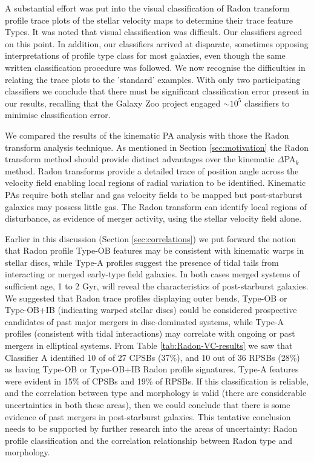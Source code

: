 A substantial effort was put into the visual classification of  Radon transform profile trace plots of the stellar velocity maps to determine their trace feature Types.  It was noted that visual classification was difficult. Our classifiers agreed on this point. In addition, our classifiers arrived at disparate, sometimes opposing interpretations of profile type class for most galaxies, even though the same written classification procedure was followed. We now recognise the difficulties in relating the trace plots to the 'standard' examples. With only two participating classifiers we conclude that there must be significant classification error present in our results, recalling that the Galaxy Zoo project engaged $\sim10^5$ classifiers to minimise classification error.

We compared the results of the kinematic PA analysis with those the Radon transform analysis technique. As mentioned in Section \ref{sec:motivation} the Radon transform method should provide distinct advantages over the kinematic $\Delta$PA$_{k}$ method. Radon transforms provide a detailed trace of position angle across the velocity field enabling local regions of radial variation to be identified. Kinematic PAs require both stellar and gas velocity fields to be mapped but post-starburst galaxies may possess little gas. The Radon transform can identify local regions of disturbance, as evidence of merger activity, using the stellar velocity field alone.

Earlier in this discussion (Section \ref{sec:correlations}) we put forward the notion that Radon profile Type-OB features may be consistent with kinematic warps in stellar discs, while Type-A profiles suggest the presence of tidal tails from interacting or merged early-type field galaxies. In both cases merged systems of sufficient age, 1 to 2 Gyr, will reveal the characteristics of post-starburst galaxies. We suggested that Radon trace profiles displaying outer bends, Type-OB or Type-OB+IB (indicating warped stellar discs) could be considered prospective candidates of past major mergers in disc-dominated systems, while Type-A profiles (consistent with tidal interactions) may correlate with ongoing or past mergers in elliptical systems. From Table \ref{tab:Radon-VC-results} we saw that Classifier A identified 10 of of 27 CPSBs (37\%), and 10 out of 36 RPSBs (28\%) as having Type-OB or Type-OB+IB Radon profile signatures. Type-A features were evident in  15\% of CPSBs and 19\% of RPSBs. If this classification is reliable, and the correlation between type and morphology is valid (there are considerable uncertainties in both these areas), then we could conclude that there is some evidence of past mergers in post-starburst galaxies. This tentative conclusion needs to be supported by further research into the areas of uncertainty: Radon profile classification and the correlation relationship between Radon type and morphology.

